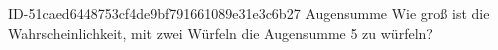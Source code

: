 \begin{exercise}
      {ID-51caed6448753cf4de9bf791661089e31e3c6b27}
      {Augensumme}
  \ifproblem\problem
    Wie groß ist die Wahrscheinlichkeit, mit zwei Würfeln die Augensumme 5
    zu würfeln?
  \fi
\end{exercise}
